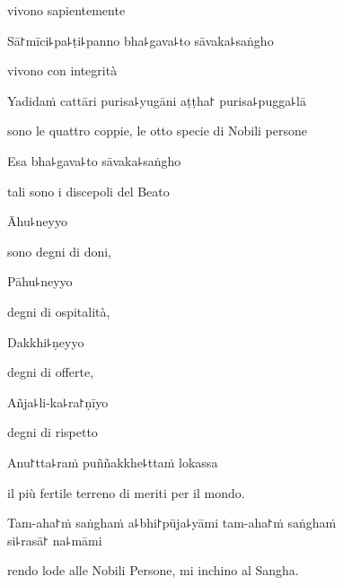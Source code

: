 \begin{english}
vivono sapientemente
\end{english}

Sā꜓mīci꜕pa꜕ṭi꜕panno bha꜕gava꜕to sāvaka꜕saṅgho

\begin{english}
vivono con integrità
\end{english}

Yadidaṁ cattāri purisa꜕yugāni aṭṭha꜓ purisa꜕pugga꜕lā

\begin{english}
sono le quattro coppie, le otto specie di Nobili persone
\end{english}

Esa bha꜕gava꜕to sāvaka꜕saṅgho

\begin{english}
tali sono i discepoli del Beato
\end{english}

Āhu꜕neyyo

\begin{english}
sono degni di doni,
\end{english}

Pāhu꜕neyyo

\begin{english}
degni di ospitalità,
\end{english}

\clearpage %

Dakkhi꜕ṇeyyo

\begin{english}
degni di offerte, 
\end{english}

Añja꜕li-ka꜕ra꜓ṇīyo

\begin{english}
degni di rispetto
\end{english}

Anu꜓tta꜕raṁ puññakkhe꜕ttaṁ lokassa

\begin{english}
il più fertile terreno di meriti per il mondo. 
\end{english}

Tam-aha꜓ṁ saṅghaṁ a꜕bhi꜓pūja꜕yāmi tam-aha꜓ṁ saṅghaṁ \\si꜕rasā꜓ na꜕māmi

\begin{english}
rendo lode alle Nobili Persone, mi inchino al Sangha. 
\end{english}

